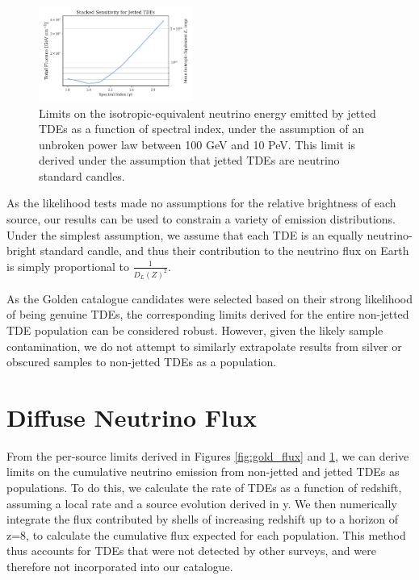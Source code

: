 \documentclass[twocolumn, tighten, linenumbers]{aastex62}
\begin{document}
\begin{figure}[!ht]
	\centering \includegraphics[width=0.45\textwidth]{figures/jetted_flux}
	\caption{Limits on the isotropic-equivalent neutrino energy emitted by jetted TDEs as a function of spectral index, under the assumption of an unbroken power law between 100 GeV and 10 PeV. This limit is derived under the assumption that jetted TDEs are neutrino standard candles.}
	\label{fig:jetted_flux}
\end{figure}

As the likelihood tests made no assumptions for the relative brightness of each source, our results can be used to constrain a variety of emission distributions. Under the simplest assumption, we assume that each TDE is an equally neutrino-bright standard candle, and thus their contribution to the neutrino flux on Earth is simply proportional to $\frac{1}{D_{L}(Z)^{2}}$. 

As the Golden catalogue candidates were selected based on their strong likelihood of being genuine TDEs, the corresponding limits derived for the entire non-jetted TDE population can be considered robust. However, given the likely sample contamination, we do not attempt to similarly extrapolate results from silver or obscured samples to non-jetted TDEs as a population.

\section{Diffuse Neutrino Flux}
\label{sec:DiffuseNeutrinoFlux}

From the per-source limits derived in Figures \ref{fig:gold_flux} and \ref{fig:jetted_flux}, we can derive limits on the cumulative neutrino emission from non-jetted and jetted TDEs as populations. To do this, we calculate the rate of TDEs as a function of redshift, assuming a local rate and a source evolution derived in y. We then numerically integrate the flux contributed by shells of increasing redshift up to a horizon of z=8, to calculate the cumulative flux expected for each population. This method thus accounts for TDEs that were not detected by other surveys, and were therefore not incorporated into our catalogue.
\end{document}
